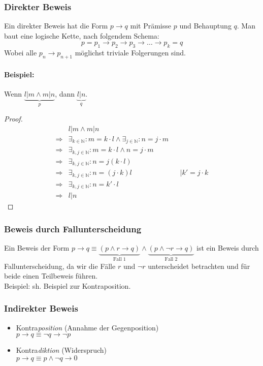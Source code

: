 \subsubsection{Direkter Beweis}
Ein direkter Beweis hat die Form $p\rightarrow q$ mit Prämisse $p$ und Behauptung $q$. Man baut eine \glqq logische Kette\grqq , nach folgendem Schema:
\[
p=p_1\rightarrow p_2 \rightarrow p_3 \rightarrow \ldots \rightarrow p_k=q
\]
Wobei alle $p_n\rightarrow p_{n+1}$ möglichst triviale Folgerungen sind.

\paragraph{Beispiel:}Wenn $\underbrace{l|m \land m|n}_{p}$, dann $\underbrace{l|n}_{q}$.
\begin{proof}
\begin{align}
&l|m \land m|n \\
\Rightarrow &\exists_{k\in\mathbb{N}}: m=k\cdot l \land \exists_{j\in\mathbb{N}}: n=j\cdot m \\
\Rightarrow &\exists_{k,j\in\mathbb{N}}: m=k\cdot l \land n=j\cdot m \\
\Rightarrow &\exists_{k,j\in\mathbb{N}}: n=j(k\cdot l) \\
\Rightarrow &\exists_{k,j\in\mathbb{N}}: n=(j\cdot k)l && \mid k'=j\cdot k \\
\Rightarrow &\exists_{k,j\in\mathbb{N}}: n=k' \cdot l \\
\Rightarrow &l|n
\end{align}
\end{proof}

\subsubsection{Beweis durch Fallunterscheidung}
Ein Beweis der Form $p\rightarrow q \equiv \underbrace{(p\land r\rightarrow q)}_\text{Fall 1} \land \underbrace{(p\land\neg r \rightarrow q)}_\text{Fall 2}$ ist ein Beweis durch Fallunterscheidung, da wir die Fälle $r$ und $\neg r$ unterscheidet betrachten und für beide einen Teilbeweis führen.\\
Beispiel: sh. Beispiel zur Kontraposition.
\subsubsection{Indirekter Beweis}
\begin{itemize}
\item Kontra\emph{position} (Annahme der Gegenposition) \\
$p\rightarrow q \equiv \neg q \rightarrow\neg p$
\item Kontra\emph{diktion} (Widerspruch) \\
$p\rightarrow q \equiv p \land\neg q \rightarrow 0$
\end{itemize}

